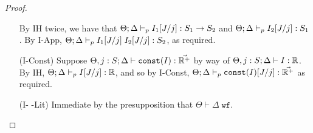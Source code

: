 \begin{proof}
\begin{itemize}
  By IH twice, we have that
  $\Theta ; \Delta \vdash_p I_1[J/j] : S_1 \to S_2$ and
  $\Theta ; \Delta \vdash_p I_2[J/j] : S_1$.
  By I-App,
  $\Theta ; \Delta \vdash_p I_1[J/j] \; I_2[J/j] : S_2$, as required.
  \item[(I-Const)] Suppose $\Theta, j : S ; \Delta \vdash \texttt{const}(I) : \vec{\mathbb{R}^+}$
  by way of
  $\Theta, j : S ; \Delta \vdash I : \mathbb{R}$.
  By IH,
  $\Theta ; \Delta \vdash_p I[J/j] : \mathbb{R}$,
  and so by I-Const,
  $\Theta ; \Delta \vdash_p \texttt{const}(I)[J/j] : \vec{\mathbb{R}^+}$
  as required.
  \item[(I-\* -Lit)] Immediate by the presupposition that $\Theta \vdash \Delta \; \texttt{wf}$.
\end{itemize}
\end{proof}
\fi